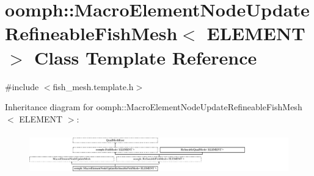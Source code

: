 \hypertarget{classoomph_1_1MacroElementNodeUpdateRefineableFishMesh}{}\section{oomph\+:\+:Macro\+Element\+Node\+Update\+Refineable\+Fish\+Mesh$<$ E\+L\+E\+M\+E\+NT $>$ Class Template Reference}
\label{classoomph_1_1MacroElementNodeUpdateRefineableFishMesh}


{\ttfamily \#include $<$fish\+\_\+mesh.\+template.\+h$>$}

Inheritance diagram for oomph\+:\+:Macro\+Element\+Node\+Update\+Refineable\+Fish\+Mesh$<$ E\+L\+E\+M\+E\+NT $>$\+:\begin{figure}[H]
\begin{center}
\leavevmode
\includegraphics[height=1.821138cm]{classoomph_1_1MacroElementNodeUpdateRefineableFishMesh}
\end{center}
\end{figure}
